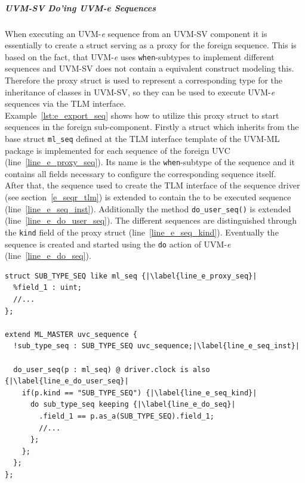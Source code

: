 \subparagraph{UVM-SV Do'ing UVM-\textit{e} Sequences}
When executing an UVM-\textit{e} sequence from an UVM-SV component it is essentially to create a struct serving as a proxy for the foreign sequence. This is based on the fact, that UVM-\textit{e} uses \lstinline$when$-subtypes to implement different sequences and UVM-SV does not contain a equivalent construct modeling this. Therefore the proxy struct is used to represent a corresponding type for the inheritance of classes in UVM-SV, so they can be used to execute UVM-\textit{e} sequences via the TLM interface.\\
Example~\ref{lst:e_export_seq} shows how to utilize this proxy struct to start sequences in the foreign sub-component. Firstly a struct which inherits from the base struct \lstinline$ml_seq$ defined at the TLM interface template of the UVM-ML package is implemented for each sequence of the foreign UVC (line~\ref{line_e_proxy_seq}). Its name is the \lstinline$when$-subtype of the sequence and it contains all fields necessary to configure the corresponding sequence itself.\\
After that, the sequence used to create the TLM interface of the sequence driver (see section~\ref{e_seqr_tlm}) is extended to contain the to be executed sequence (line~\ref{line_e_seq_inst}). Additionally the method \lstinline$do_user_seq()$ is extended (line~\ref{line_e_do_user_seq}). The different sequences are distinguished through the \lstinline$kind$ field of the proxy struct (line~\ref{line_e_seq_kind}). Eventually the sequence is created and started using the \lstinline$do$ action of UVM-\textit{e} (line~\ref{line_e_do_seq}).
\lstset{language=e, numbers = left, escapechar=|, breaklines=true}
\begin{lstlisting}[frame=htrbl, caption={\textit{e}: executing the sequence received from the proxy sequencer},
label={lst:e_export_seq}]
struct SUB_TYPE_SEQ like ml_seq {|\label{line_e_proxy_seq}|
  %field_1 : uint;
  //...
};

extend ML_MASTER uvc_sequence {
  !sub_type_seq : SUB_TYPE_SEQ uvc_sequence;|\label{line_e_seq_inst}|

  do_user_seq(p : ml_seq) @ driver.clock is also {|\label{line_e_do_user_seq}|
    if(p.kind == "SUB_TYPE_SEQ") {|\label{line_e_seq_kind}|
      do sub_type_seq keeping {|\label{line_e_do_seq}|
        .field_1 == p.as_a(SUB_TYPE_SEQ).field_1;
        //...
      };
    };
  };
};
\end{lstlisting}
